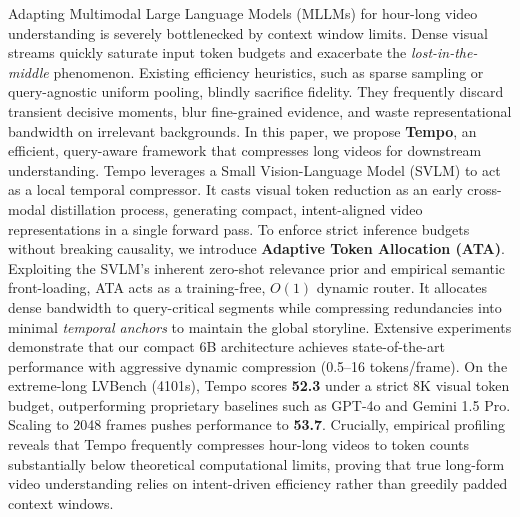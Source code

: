 Adapting Multimodal Large Language Models (MLLMs) for hour-long video understanding is severely bottlenecked by context window limits.
%
Dense visual streams quickly saturate input token budgets and exacerbate the \emph{lost-in-the-middle} phenomenon. Existing efficiency heuristics, such as sparse sampling or query-agnostic uniform pooling, blindly sacrifice fidelity. They frequently discard transient decisive moments, blur fine-grained evidence, and waste representational bandwidth on irrelevant backgrounds.
%
In this paper, we propose \textbf{Tempo}, an efficient, query-aware framework that compresses long videos for downstream understanding. Tempo leverages a Small Vision-Language Model (SVLM) to act as a local temporal compressor. It casts visual token reduction as an early cross-modal distillation process, generating compact, intent-aligned video representations in a single forward pass.
%
To enforce strict inference budgets without breaking causality, we introduce \textbf{Adaptive Token Allocation (ATA)}. Exploiting the SVLM's inherent zero-shot relevance prior and empirical semantic front-loading, ATA acts as a training-free, $O(1)$ dynamic router. It allocates dense bandwidth to query-critical segments while compressing redundancies into minimal \emph{temporal anchors} to maintain the global storyline.
%
Extensive experiments demonstrate that our compact 6B architecture achieves state-of-the-art performance with aggressive dynamic compression (0.5--16 tokens/frame). On the extreme-long LVBench (4101s), Tempo scores \textbf{52.3} under a strict 8K visual token budget, outperforming proprietary baselines such as GPT-4o and Gemini 1.5 Pro. Scaling to 2048 frames pushes performance to \textbf{53.7}.
%
Crucially, empirical profiling reveals that Tempo frequently compresses hour-long videos to token counts substantially below theoretical computational limits, proving that true long-form video understanding relies on intent-driven efficiency rather than greedily padded context windows.